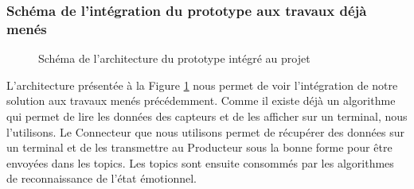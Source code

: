 \documentclass[11pt]{article}
\begin{document}
		\subsubsection{Schéma de l'intégration du prototype aux travaux déjà menés}\label{sec:schematravaux}
			\begin{figure}
				\centering
				\vspace*{-1cm}
				\caption{Schéma de l'architecture du prototype intégré au projet}
				\label{fig:archiglobale}
			\end{figure}
			L'architecture présentée à la Figure \ref{fig:archiglobale} nous permet de voir l'intégration de notre solution aux travaux menés précédemment.
			Comme il existe déjà un algorithme qui permet de lire les données des capteurs et de les afficher sur un terminal, nous l'utilisons.
			Le Connecteur que nous utilisons permet de récupérer des données sur un terminal et de les transmettre au Producteur sous la bonne forme pour être envoyées dans les topics.
			Les topics sont ensuite consommés par les algorithmes de reconnaissance de l'état émotionnel.
\end{document}
